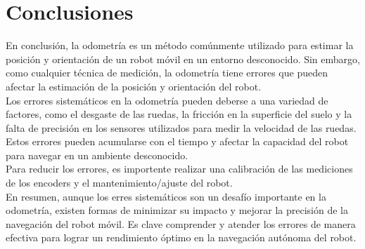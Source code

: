 \documentclass[oneside,twocolumn]{article}
\begin{document}
\section{Conclusiones}

En conclusión, la odometría es un método comúnmente utilizado para estimar la posición y orientación de un robot móvil en un entorno desconocido. Sin embargo, como cualquier técnica de medición, la odometría tiene errores que pueden afectar la estimación de la posición y orientación del robot.\\

Los errores sistemáticos en la odometría pueden deberse a una variedad de factores, como el desgaste de las ruedas, la fricción en la superficie del suelo y la falta de precisión en los sensores utilizados para medir la velocidad de las ruedas. Estos errores pueden acumularse con el tiempo y afectar la capacidad del robot para navegar en un ambiente desconocido.\\

Para reducir los errores, es importente realizar una calibración de las mediciones de los encoders y el mantenimiento/ajuste del robot.\\

En resumen, aunque los erres sistemáticos son un desafío importante en la odometría, existen formas de minimizar su impacto y mejorar la precisión de la navegación del robot móvil. Es clave comprender y atender los errores de manera efectiva para lograr un rendimiento óptimo en la navegación autónoma del robot.

\end{document}
